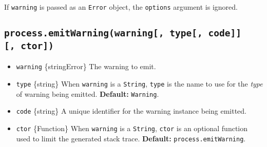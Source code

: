 \begin{Shaded}
\begin{Highlighting}[]
  \OperatorTok{=} \NormalTok{(}\NormalTok{)}\OperatorTok{;}

\NormalTok{(}\OperatorTok{,}\KeywordTok{=\textgreater{}}\NormalTok{ \{}
  \NormalTok{)}\OperatorTok{;}    
  \NormalTok{)}\OperatorTok{;} 
  \NormalTok{)}\OperatorTok{;}    
  \NormalTok{)}\OperatorTok{;}   
  \NormalTok{)}\OperatorTok{;}  
\NormalTok{\})}\OperatorTok{;}
\end{Highlighting}
\end{Shaded}

If \texttt{warning} is passed as an \texttt{Error} object, the
\texttt{options} argument is ignored.

\subsection{\texorpdfstring{\texttt{process.emitWarning(warning{[},\ type{[},\ code{]}{]}{[},\ ctor{]})}}{process.emitWarning(warning{[}, type{[}, code{]}{]}{[}, ctor{]})}}\label{process.emitwarningwarning-type-code-ctor}

\begin{itemize}
\tightlist
\item
  \texttt{warning} \{string\textbar Error\} The warning to emit.
\item
  \texttt{type} \{string\} When \texttt{warning} is a \texttt{String},
  \texttt{type} is the name to use for the \emph{type} of warning being
  emitted. \textbf{Default:}
  \texttt{\textquotesingle{}Warning\textquotesingle{}}.
\item
  \texttt{code} \{string\} A unique identifier for the warning instance
  being emitted.
\item
  \texttt{ctor} \{Function\} When \texttt{warning} is a \texttt{String},
  \texttt{ctor} is an optional function used to limit the generated
  stack trace. \textbf{Default:} \texttt{process.emitWarning}.
\end{itemize}

